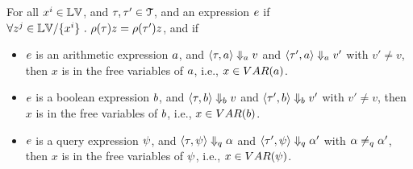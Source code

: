 \begin{lem}
	\label{lem:inv_expr}
	For all {$ x^i \in \mathbb{LV}$, and $\mathtt{\tau}, \mathtt{\tau}' \in \mathcal{T}$, and an expression $e$} if
	$ \forall z^j \in \mathbb{LV} / \{x^i\} ~.~ 
	\rho(\mathtt{\tau}) z = \rho(\mathtt{\tau}') z $, and if
	\begin{itemize}
		\item $e$ is an arithmetic expression $a$,
		and $\langle \mathtt{\tau}, a \rangle \Downarrow_a v $ and 
	$\langle \mathtt{\tau}', a \rangle \Downarrow_a v' $ with $v' \neq v$, 
	then $ x $ is in the free variables of $a$, i.e., $x \in VAR(a)$.
%
	\item $e$ is a boolean expression $b$,
  and $\langle \mathtt{\tau}, b \rangle \Downarrow_b v $ and 
 $\langle \mathtt{\tau}', b \rangle \Downarrow_b v' $ with $v' \neq v$, then $ x $ is in the free variables of $b$, i.e., $x \in VAR(b)$.
% 
	\item $e$ is a query expression $\psi$,
	and $\langle \mathtt{\tau}, \psi \rangle \Downarrow_q \alpha $ and 
	$\langle \mathtt{\tau}', \psi \rangle \Downarrow_q \alpha' $ with $\alpha \neq_{q} \alpha'$, then $ x $ is in the free variables of $\psi$, i.e., $x \in VAR(\psi)$.
\end{itemize}	%
	\end{lem}
